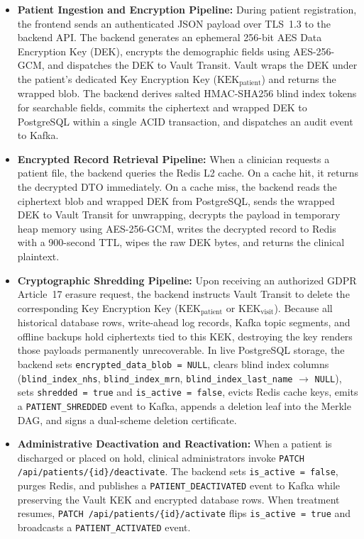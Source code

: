 \begin{itemize}
    \item \textbf{Patient Ingestion and Encryption Pipeline:} During patient registration, the frontend sends an authenticated JSON payload over TLS~1.3 to the backend API. The backend generates an ephemeral 256-bit AES Data Encryption Key (DEK), encrypts the demographic fields using AES-256-GCM, and dispatches the DEK to Vault Transit. Vault wraps the DEK under the patient's dedicated Key Encryption Key ($\text{KEK}_{\text{patient}}$) and returns the wrapped blob. The backend derives salted HMAC-SHA256 blind index tokens for searchable fields, commits the ciphertext and wrapped DEK to PostgreSQL within a single ACID transaction, and dispatches an audit event to Kafka.

    \item \textbf{Encrypted Record Retrieval Pipeline:} When a clinician requests a patient file, the backend queries the Redis L2 cache. On a cache hit, it returns the decrypted DTO immediately. On a cache miss, the backend reads the ciphertext blob and wrapped DEK from PostgreSQL, sends the wrapped DEK to Vault Transit for unwrapping, decrypts the payload in temporary heap memory using AES-256-GCM, writes the decrypted record to Redis with a 900-second TTL, wipes the raw DEK bytes, and returns the clinical plaintext.

    \item \textbf{Cryptographic Shredding Pipeline:} Upon receiving an authorized GDPR Article~17 erasure request, the backend instructs Vault Transit to delete the corresponding Key Encryption Key ($\text{KEK}_{\text{patient}}$ or $\text{KEK}_{\text{visit}}$). Because all historical database rows, write-ahead log records, Kafka topic segments, and offline backups hold ciphertexts tied to this KEK, destroying the key renders those payloads permanently unrecoverable. In live PostgreSQL storage, the backend sets \texttt{encrypted\_data\_blob = NULL}, clears blind index columns (\texttt{blind\_index\_nhs}, \texttt{blind\_index\_mrn}, \texttt{blind\_index\_last\_name} $\rightarrow$ \texttt{NULL}), sets \texttt{shredded = true} and \texttt{is\_active = false}, evicts Redis cache keys, emits a \texttt{PATIENT\_SHREDDED} event to Kafka, appends a deletion leaf into the Merkle DAG, and signs a dual-scheme deletion certificate.

    \item \textbf{Administrative Deactivation and Reactivation:} When a patient is discharged or placed on hold, clinical administrators invoke \texttt{PATCH /api/patients/\{id\}/deactivate}. The backend sets \texttt{is\_active = false}, purges Redis, and publishes a \texttt{PATIENT\_DEACTIVATED} event to Kafka while preserving the Vault KEK and encrypted database rows. When treatment resumes, \texttt{PATCH /api/patients/\{id\}/activate} flips \texttt{is\_active = true} and broadcasts a \texttt{PATIENT\_ACTIVATED} event.
\end{itemize}

